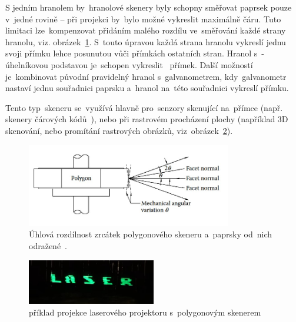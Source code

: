 
%

S jedním hranolem by~hranolové skenery byly schopny směřovat paprsek pouze v~jedné rovině -- při projekci by~bylo možné vykreslit maximálně čáru. Tuto limitaci lze~kompenzovat přidáním malého rozdílu ve~směřování každé strany hranolu, viz. obrázek~\ref{fig:polygon-angular-variation}. S~touto úpravou každá strana hranolu vykreslí jednu svoji přímku lehce posunutou vůči přímkách ostatních stran. Hranol s~-úhelníkovou podstavou je~schopen vykreslit ~přímek.
Další možností je~kombinovat původní pravidelný hranol s~galvanometrem, kdy~galvanometr nastaví jednu souřadnici paprsku a~hranol na~této souřadnici vykreslí přímku.

Tento typ~skeneru se~využívá hlavně pro~senzory skenující na~přímce (např. skenery čárových kódů~\cite{history-of-barcode-scanning}), nebo při rastrovém procházení plochy (například 3D skenování, nebo promítání rastrových obrázků, viz~obrázek~\ref{fig:harddrive-projection}).

\begin{figure}[H]
  \centering
  \includegraphics[width=0.8\textwidth]{img/polygon-angular-variation.jpg}
  \caption{\label{fig:polygon-angular-variation} Úhlová rozdílnost zrcátek polygonového skeneru a~paprsky od~nich odražené~\cite{scanning-handbook}.}
\end{figure}


\begin{figure}[H]
  \centering
  \includegraphics[width=0.5\textwidth]{img/harddrive-projection.jpg}
  \caption{\label{fig:harddrive-projection} příklad projekce laserového projektoru s~polygonovým skenerem~\cite{harddrive-projector-youtube}}
\end{figure}

